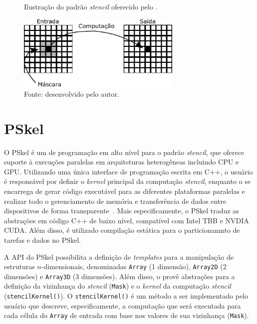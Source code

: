\begin{figure}[t]
	\centering
	\caption{Ilustração do padrão \textit{stencil} oferecido pelo \pskel.}
	\includegraphics[width=0.7\textwidth]{figs/stencilComp.pdf}
    \caption*{Fonte: desenvolvido pelo autor.}
	\label{fig:stencil}
\end{figure}


\section{PSkel}
O PSkel é um \fw de programação em alto nível para o padrão \textit{stencil}, que
oferece suporte à execuções paralelas em arquiteturas heterogêneas incluindo CPU
e GPU. Utilizando uma única interface de programação escrita em C++, o usuário é
responsável por definir o \textit{kernel} principal da computação \textit{stencil},
enquanto o \fw se encarrega de gerar código executável para as diferentes
plataformas paralelas e realizar todo o gerenciamento de memória e transferência
de dados entre dispositivos de forma transparente~\cite{pereira15}. Mais
especificamente, o PSkel traduz as abstrações em código C++ de baixo nível,
compatível com Intel TBB e NVDIA CUDA. Além disso, é utilizado compilação
estática para o particionamnto de tarefas e dados no PSkel.

A API do PSkel possibilita a definição de \textit{templates} para a manipulação
de estruturas $n$-dimensionais, denominadas \texttt{Array} (1 dimensão),
\texttt{Array2D} (2 dimensões) e \texttt{Array3D} (3 dimensões). Além disso, o
\fw provê abstrações para a definição da vizinhança do \textit{stencil} (\texttt{Mask})
e o \textit{kernel} da computação \textit{stencil} (\texttt{stencilKernel()}). O
\texttt{stencilKernel()} é um método a ser implementado pelo usuário que
descreve, especificamente, a computação que será executada para cada célula do
\texttt{Array} de entrada com base nos valores de sua vizinhança (\texttt{Mask}).

